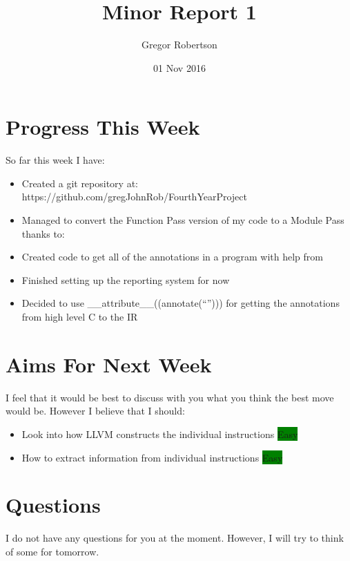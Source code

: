 \documentclass{article}
\title{Minor Report 1}
\author{Gregor Robertson}
\date{01 Nov 2016}
\begin{document}
 
\maketitle
 
\section*{Progress This Week}
So far this week I have:
\begin{itemize}
	\item Created a git repository at: https://github.com/gregJohnRob/FourthYearProject
	\item Managed to convert the Function Pass version of my code to a Module Pass thanks to: \cite{ModulePassError}
	\item Created code to get all of the annotations in a program with help from \cite{getAnnotations}
	\item Finished setting up the reporting system for now
	\item Decided to use \_\_attribute\_\_((annotate(``''))) for getting the annotations from high level C to the IR
\end{itemize}

\section*{Aims For Next Week}
I feel that it would be best to discuss with you what you think the best move would be. However I believe that I should:
\begin{itemize}
	\item Look into how LLVM constructs the individual instructions \colorbox{Green}{\color{Black}Easy}
	\item How to extract information from individual instructions \colorbox{Green}{\color{Black}Easy}
\end{itemize}

\section*{Questions}
I do not have any questions for you at the moment. However, I will try to think of some for tomorrow. 

\medskip
 
\printbibliography
\end{document}
